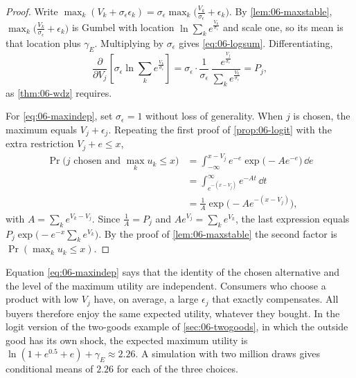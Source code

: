 \begin{proof}
Write $\max_k(V_k + \sigma_\epsilon\epsilon_k) = \sigma_\epsilon\max_k\big(\frac{V_k}{\sigma_\epsilon} + \epsilon_k\big)$. By
\cref{lem:06-maxstable}, $\max_k\big(\frac{V_k}{\sigma_\epsilon} + \epsilon_k\big)$ is Gumbel with location
$\ln\sum_k e^{\frac{V_k}{\sigma_\epsilon}}$ and scale one, so its mean is that location plus $\gamma_E$.
Multiplying by $\sigma_\epsilon$ gives \eqref{eq:06-logsum}. Differentiating,
\begin{equation*}
\frac{\partial}{\partial V_j}\left[\sigma_\epsilon\ln\sum_k e^{\frac{V_k}{\sigma_\epsilon}}\right]
= \sigma_\epsilon\cdot\frac{1}{\sigma_\epsilon}\,\frac{e^{\frac{V_j}{\sigma_\epsilon}}}{\sum_k e^{\frac{V_k}{\sigma_\epsilon}}} = P_j ,
\end{equation*}
as \cref{thm:06-wdz} requires.

For \eqref{eq:06-maxindep}, set $\sigma_\epsilon = 1$ without loss of generality. When $j$ is chosen, the maximum
equals $V_j + \epsilon_j$. Repeating the first proof of \cref{prop:06-logit} with the extra restriction
$V_j + e \le x$,
\begin{align*}
\Pr\Big(j \text{ chosen and } \max_k u_k \le x\Big)
&= \int_{-\infty}^{x - V_j} e^{-e}\exp\big(-Ae^{-e}\big)\,\dd e \\
&= \int_{e^{-(x - V_j)}}^{\infty} e^{-At}\,\dd t \\
&= \frac{1}{A}\exp\big(-Ae^{-(x - V_j)}\big),
\end{align*}
with $A = \sum_k e^{V_k - V_j}$. Since $\frac{1}{A} = P_j$ and $Ae^{V_j} = \sum_k e^{V_k}$, the last expression equals
$P_j\exp\big(-e^{-x}\sum_k e^{V_k}\big)$. By the proof of \cref{lem:06-maxstable} the second factor is
$\Pr(\max_k u_k \le x)$.
\end{proof}

Equation \eqref{eq:06-maxindep} says that the identity of the chosen alternative and the level of the maximum
utility are independent. Consumers who choose a product with low $V_j$ have, on average, a large
$\epsilon_j$ that exactly compensates. All buyers therefore enjoy the same expected utility, whatever they bought.
In the logit version of the two-goods example of \cref{sec:06-twogoods}, in which the outside good has its own shock,
the expected maximum utility is $\ln(1 + e^{0.5} + e) + \gamma_E \approx 2.26$.
A simulation with two million draws gives conditional means of $2.26$ for each of the three choices.

